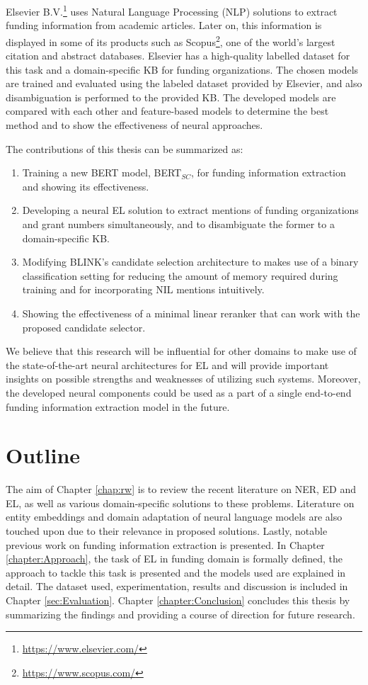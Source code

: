 \documentclass{report}
\theoremstyle{definition}
\theoremstyle{remark}
\begin{document}
Elsevier B.V.\footnote{\url{https://www.elsevier.com/}} uses Natural Language Processing (NLP) solutions to extract funding information from academic articles. Later on, this information is displayed in some of its products such as Scopus\footnote{\url{https://www.scopus.com/}}, one of the world's largest citation and abstract databases. Elsevier has a high-quality labelled dataset for this task and a domain-specific KB for funding organizations. The chosen models are trained and evaluated using the labeled dataset provided by Elsevier, and also disambiguation is performed to the provided KB. The developed models are compared with each other and feature-based models to determine the best method and to show the effectiveness of neural approaches.

The contributions of this thesis can be summarized as:
\renewcommand{\labelenumi}{\arabic{enumi}.} 
\begin{enumerate}
    \item Training a new BERT model, BERT$_{SC}$, for funding information extraction and showing its effectiveness.
    \item Developing a neural EL solution to extract mentions of funding organizations and grant numbers simultaneously, and to disambiguate the former to a domain-specific KB. 
    \item Modifying BLINK's candidate selection architecture to makes use of a binary classification setting for reducing the amount of memory required during training and for incorporating NIL mentions intuitively.
    \item Showing the effectiveness of a minimal linear reranker that can work with the proposed candidate selector.
\end{enumerate}

We believe that this research will be influential for other domains to make use of the state-of-the-art neural architectures for EL and will provide important insights on possible strengths and weaknesses of utilizing such systems. Moreover, the developed neural components could be used as a part of a single end-to-end funding information extraction model in the future.

\section{Outline}
The aim of Chapter \ref{chap:rw} is to review the recent literature on NER, ED and EL, as well as various domain-specific solutions to these problems. Literature on entity embeddings and domain adaptation of neural language models are also touched upon due to their relevance in proposed solutions. Lastly, notable previous work on funding information extraction is presented. In Chapter \ref{chapter:Approach}, the task of EL in funding domain is formally defined, the approach to tackle this task is presented and the models used are explained in detail. The dataset used, experimentation, results and discussion is included in Chapter \ref{sec:Evaluation}. Chapter \ref{chapter:Conclusion} concludes this thesis by summarizing the findings and providing a course of direction for future research.
\end{document}
